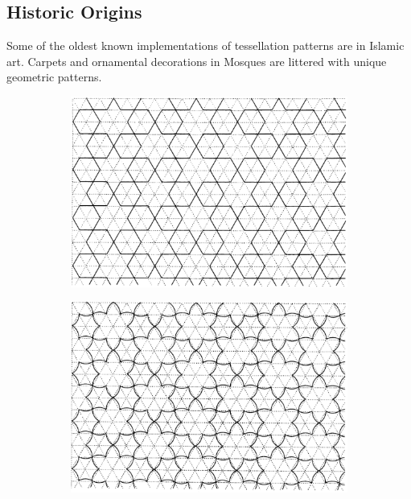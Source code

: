 \documentclass[12pt,letterpaper]{article}
\begin{document}
\subsection{Historic Origins}
Some of the oldest known implementations of tessellation patterns are in Islamic art. Carpets and ornamental decorations in Mosques are littered with unique geometric patterns. 

\begin{figure}[H]
    \begin{center}
        \caption{Artistic tessellations in the style of traditional Islamic art.}
        \label{fig:islam}
        \begin{subfigure}[b]{.3\linewidth}
            \includegraphics[width=\linewidth]{islam1}
        \end{subfigure}
        \begin{subfigure}[b]{.3\linewidth}
            \includegraphics[width=\linewidth]{islam2}

\end{subfigure}
\end{center}
\end{figure}
\end{document}
